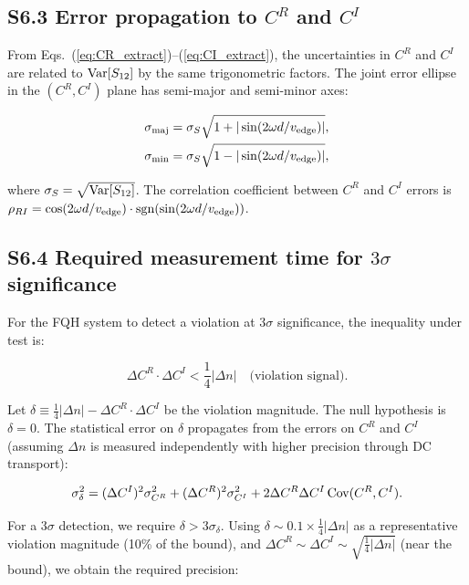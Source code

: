 \documentclass[prd,aps,showpacs,superscriptaddress,twocolumn]{revtex4-2}
\begin{document}
\subsection{S6.3 Error propagation to $C^R$ and $C^I$}

From Eqs.~(\ref{eq:CR_extract})--(\ref{eq:CI_extract}), the uncertainties in $C^R$ and $C^I$ are related to ${\rm Var}[S_{12}]$ by the same trigonometric factors. The joint error ellipse in the $(C^R, C^I)$ plane has semi-major and semi-minor axes:

\begin{align}
\sigma_{\rm maj} &= \sigma_{S} \sqrt{1 + |\sin(2\omega d/v_{\rm edge})|}, \label{eq:ellipse_maj}\\
\sigma_{\rm min} &= \sigma_{S} \sqrt{1 - |\sin(2\omega d/v_{\rm edge})|}, \label{eq:ellipse_min}
\end{align}

where $\sigma_S = \sqrt{{\rm Var}[S_{12}]}$. The correlation coefficient between $C^R$ and $C^I$ errors is $\rho_{RI} = \cos(2\omega d/v_{\rm edge}) \cdot {\rm sgn}(\sin(2\omega d/v_{\rm edge}))$.

\subsection{S6.4 Required measurement time for $3\sigma$ significance}

For the FQH system to detect a violation at $3\sigma$ significance, the inequality under test is:

\begin{equation}
\Delta C^R \cdot \Delta C^I < \frac{1}{4} |\Delta n| \quad \text{(violation signal)}.
\label{eq:FQH_violation}
\end{equation}

Let $\delta \equiv \frac{1}{4}|\Delta n| - \Delta C^R \cdot \Delta C^I$ be the violation magnitude. The null hypothesis is $\delta = 0$. The statistical error on $\delta$ propagates from the errors on $C^R$ and $C^I$ (assuming $\Delta n$ is measured independently with higher precision through DC transport):

\begin{equation}
\sigma_\delta^2 = (\Delta C^I)^2 \sigma_{C^R}^2 + (\Delta C^R)^2 \sigma_{C^I}^2 + 2 \Delta C^R \Delta C^I \, {\rm Cov}(C^R, C^I).
\label{eq:sigma_delta}
\end{equation}

For a $3\sigma$ detection, we require $\delta > 3 \sigma_\delta$. Using $\delta \sim 0.1 \times \frac{1}{4}|\Delta n|$ as a representative violation magnitude (10\% of the bound), and $\Delta C^R \sim \Delta C^I \sim \sqrt{\frac{1}{4}|\Delta n|}$ (near the bound), we obtain the required precision:
\end{document}
